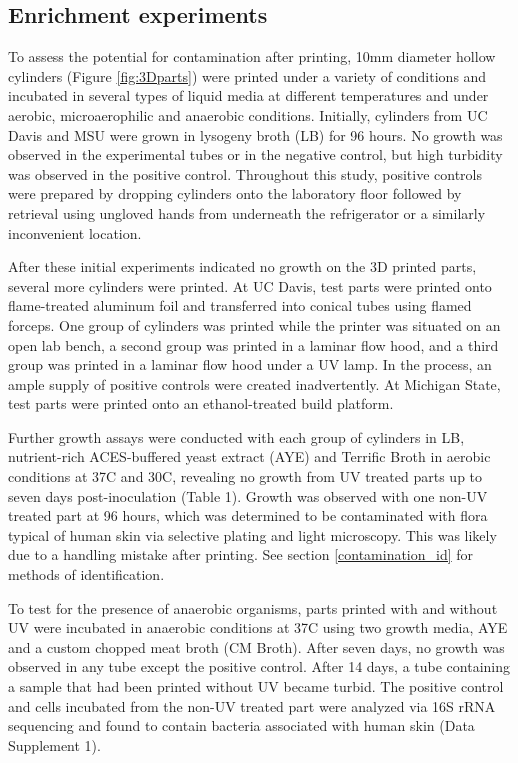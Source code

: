 \begin{refsection}
\subsection{Enrichment experiments}

To assess the potential for contamination after printing, 10mm
diameter hollow cylinders (Figure \ref{fig:3Dparts}) were printed
under a variety of conditions and incubated in several types of liquid
media at different temperatures and under aerobic, microaerophilic and
anaerobic conditions.  Initially, cylinders from UC Davis and MSU were
grown in lysogeny broth (LB) for 96 hours. No growth was observed in
the experimental tubes or in the negative control, but high turbidity
was observed in the positive control.  Throughout this study, positive
controls were prepared by dropping cylinders onto the laboratory floor
followed by retrieval using ungloved hands from underneath the
refrigerator or a similarly inconvenient location.

After these initial experiments indicated no growth on the 3D printed
parts, several more cylinders were printed. At UC Davis, test parts
were printed onto flame-treated aluminum foil and transferred into
conical tubes using flamed forceps. One group of cylinders was printed
while the printer was situated on an open lab bench, a second group
was printed in a laminar flow hood, and a third group was printed in a
laminar flow hood under a UV lamp. In the process, an ample supply of
positive controls were created inadvertently. At Michigan State, test
parts were printed onto an ethanol-treated build platform.

Further growth assays were conducted with each group of cylinders in
LB, nutrient-rich ACES-buffered yeast extract (AYE) \cite{AYE_broth}
and Terrific Broth in aerobic conditions at 37C and 30C, revealing no
growth from UV treated parts up to seven days post-inoculation (Table
1). Growth was observed with one non-UV treated part at 96 hours,
which was determined to be contaminated with flora typical of human
skin via selective plating and light microscopy. This was likely due
to a handling mistake after printing. See section
\ref{contamination_id} for methods of identification.
 
To test for the presence of anaerobic organisms, parts printed with
and without UV were incubated in anaerobic conditions at 37C using two
growth media, AYE and a custom chopped meat broth (CM Broth).
\cite{seaweed_human_gut} After seven days, no growth was observed in
any tube except the positive control. After 14 days, a tube containing
a sample that had been printed without UV became turbid. The positive
control and cells incubated from the non-UV treated part were analyzed
via 16S rRNA sequencing and found to contain bacteria associated with
human skin (Data Supplement 1).


\end{refsection}
